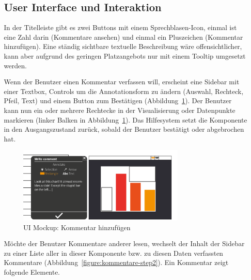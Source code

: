 \documentclass[
	headsepline,
	footsepline,
	fontsize=12pt,
	bibliography=totoc
]{scrbook}
\begin{document}
\subsection{User Interface und Interaktion}
\label{section:konzeption:kommentare:ui}


In der Titelleiste gibt es zwei Buttons mit einem Sprechblasen-Icon, einmal ist eine Zahl darin (Kommentare ansehen) und einmal ein Pluszeichen (Kommentar hinzufügen). Eine ständig sichtbare textuelle Beschreibung wäre offensichtlicher, kann aber aufgrund des geringen Platzangebots nur mit einem Tooltip umgesetzt werden.

Wenn der Benutzer einen Kommentar verfassen will, erscheint eine Sidebar mit einer Textbox, Controls um die Annotationsform zu ändern (Auswahl, Rechteck, Pfeil, Text) und einem Button zum Bestätigen (Abbildung~\ref{figure:kommentare-step4}). Der Benutzer kann nun ein oder mehrere Rechtecke in der Visualisierung oder Datenpunkte markieren (linker Balken in Abbildung~\ref{figure:kommentare-step4}). Das Hilfesystem setzt die Komponente in den Ausgangszustand zurück, sobald der Benutzer bestätigt oder abgebrochen hat.

\begin{figure}[htbp]
   \centering
   \includegraphics[width=0.75\textwidth]{images/konzeption-kommentare-step4.png}
   \caption{UI Mockup: Kommentar hinzufügen}
   \label{figure:kommentare-step4}
\end{figure}

Möchte der Benutzer Kommentare anderer lesen, wechselt der Inhalt der Sidebar zu einer Liste aller in dieser Komponente bzw. zu diesen Daten verfassten Kommentare (Abbildung~\ref{figure:kommentare-step2}). Ein Kommentar zeigt folgende Elemente.
\end{document}
